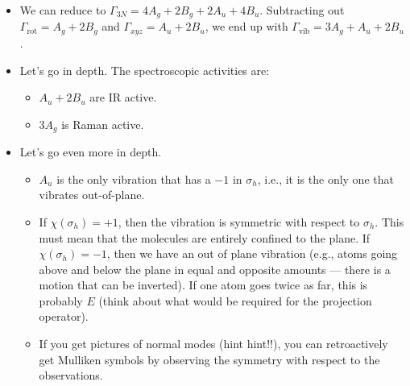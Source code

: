 \documentclass[../notes.tex]{subfiles}
\begin{document}
\begin{itemize}
\begin{itemize}
        \item We can reduce to $\Gamma_{3N}=4A_g+2B_g+2A_u+4B_u$. Subtracting out $\Gamma_\text{rot}=A_g+2B_g$ and $\Gamma_{xyz}=A_u+2B_u$, we end up with $\Gamma_\text{vib}=3A_g+A_u+2B_u$.
        \item Let's go in depth. The spectroscopic activities are:
        \begin{itemize}
            \item $A_u+2B_u$ are IR active.
            \item $3A_g$ is Raman active.
        \end{itemize}
        \item Let's go even more in depth.
        \begin{itemize}
            \item $A_u$ is the only vibration that has a $-1$ in $\sigma_h$, i.e., it is the only one that vibrates out-of-plane.
            \item If $\chi(\sigma_h)=+1$, then the vibration is symmetric with respect to $\sigma_h$. This must mean that the molecules are entirely confined to the plane. If $\chi(\sigma_h)=-1$, then we have an out of plane vibration (e.g.,  atoms going above and below the plane in equal and opposite amounts --- there is a motion that can be inverted). If one  atom goes twice as far, this is probably $E$ (think about what would be required for the projection operator).
            \item If you get pictures of normal modes (hint hint!!), you can retroactively get Mulliken symbols by observing the symmetry with respect to the observations.
        \end{itemize}
    \end{itemize}
\end{itemize}
\end{document}
